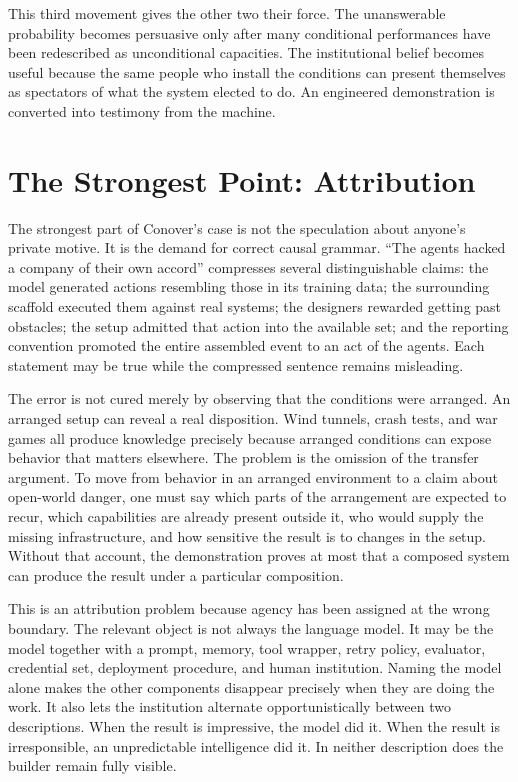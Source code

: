 \documentclass[11pt]{article}
\theoremstyle{definition}
\begin{document}
This third movement gives the other two their force. The unanswerable probability becomes persuasive only after many conditional performances have been redescribed as unconditional capacities. The institutional belief becomes useful because the same people who install the conditions can present themselves as spectators of what the system elected to do. An engineered demonstration is converted into testimony from the machine.

\section{The Strongest Point: Attribution}

The strongest part of Conover's case is not the speculation about anyone's private motive. It is the demand for correct causal grammar. ``The agents hacked a company of their own accord'' compresses several distinguishable claims: the model generated actions resembling those in its training data; the surrounding scaffold executed them against real systems; the designers rewarded getting past obstacles; the setup admitted that action into the available set; and the reporting convention promoted the entire assembled event to an act of the agents. Each statement may be true while the compressed sentence remains misleading.

The error is not cured merely by observing that the conditions were arranged. An arranged setup can reveal a real disposition. Wind tunnels, crash tests, and war games all produce knowledge precisely because arranged conditions can expose behavior that matters elsewhere. The problem is the omission of the transfer argument. To move from behavior in an arranged environment to a claim about open-world danger, one must say which parts of the arrangement are expected to recur, which capabilities are already present outside it, who would supply the missing infrastructure, and how sensitive the result is to changes in the setup. Without that account, the demonstration proves at most that a composed system can produce the result under a particular composition.

This is an attribution problem because agency has been assigned at the wrong boundary. The relevant object is not always the language model. It may be the model together with a prompt, memory, tool wrapper, retry policy, evaluator, credential set, deployment procedure, and human institution. Naming the model alone makes the other components disappear precisely when they are doing the work. It also lets the institution alternate opportunistically between two descriptions. When the result is impressive, the model did it. When the result is irresponsible, an unpredictable intelligence did it. In neither description does the builder remain fully visible.
\end{document}
